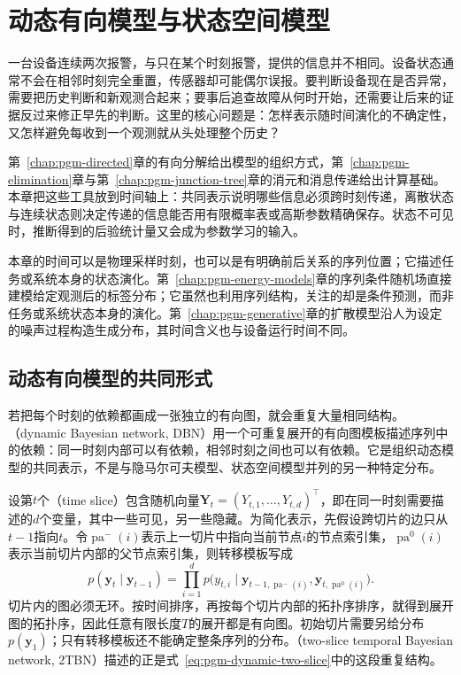 \chapter{动态有向模型与状态空间模型}
\label{chap:pgm-dynamic}

一台设备连续两次报警，与只在某个时刻报警，提供的信息并不相同。设备状态通常不会在相邻时刻完全重置，传感器却可能偶尔误报。要判断设备现在是否异常，需要把历史判断和新观测合起来；要事后追查故障从何时开始，还需要让后来的证据反过来修正早先的判断。这里的核心问题是：怎样表示随时间演化的不确定性，又怎样避免每收到一个观测就从头处理整个历史？

第~\ref{chap:pgm-directed}章的有向分解给出模型的组织方式，第~\ref{chap:pgm-elimination}章与第~\ref{chap:pgm-junction-tree}章的消元和消息传递给出计算基础。本章把这些工具放到时间轴上：共同表示说明哪些信息必须跨时刻传递，离散状态与连续状态则决定传递的信息能否用有限概率表或高斯参数精确保存。状态不可见时，推断得到的后验统计量又会成为参数学习的输入。

本章的时间可以是物理采样时刻，也可以是有明确前后关系的序列位置；它描述任务或系统本身的状态演化。第~\ref{chap:pgm-energy-models}章的序列条件随机场直接建模给定观测后的标签分布；它虽然也利用序列结构，关注的却是条件预测，而非任务或系统状态本身的演化。第~\ref{chap:pgm-generative}章的扩散模型沿人为设定的噪声过程构造生成分布，其时间含义也与设备运行时间不同。

\section{动态有向模型的共同形式}
\label{sec:pgm-dynamic-common}

若把每个时刻的依赖都画成一张独立的有向图，就会重复大量相同结构。（dynamic Bayesian network, DBN）用一个可重复展开的有向图模板描述序列中的依赖：同一时刻内部可以有依赖，相邻时刻之间也可以有依赖。它是组织动态模型的共同表示，不是与隐马尔可夫模型、状态空间模型并列的另一种特定分布。

设第$t$个（time slice）包含随机向量$\bm{Y}_t=(Y_{t,1},\ldots,Y_{t,d})^\top$，即在同一时刻需要描述的$d$个变量，其中一些可见，另一些隐藏。为简化表示，先假设跨切片的边只从$t-1$指向$t$。令$\operatorname{pa}^{-}(i)$表示上一切片中指向当前节点$i$的节点索引集，$\operatorname{pa}^{0}(i)$表示当前切片内部的父节点索引集，则转移模板写成
\begin{equation}
  p(\bm{y}_t\mid\bm{y}_{t-1})
  =\prod_{i=1}^{d}
    p\bigl(y_{t,i}\mid
      \bm{y}_{t-1,\operatorname{pa}^{-}(i)},
      \bm{y}_{t,\operatorname{pa}^{0}(i)}\bigr).
  \label{eq:pgm-dynamic-two-slice}
\end{equation}
切片内的图必须无环。按时间排序，再按每个切片内部的拓扑序排序，就得到展开图的拓扑序，因此任意有限长度$T$的展开都是有向图。初始切片需要另给分布$p(\bm{y}_1)$；只有转移模板还不能确定整条序列的分布。（two-slice temporal Bayesian network, 2TBN）描述的正是式~\eqref{eq:pgm-dynamic-two-slice}中的这段重复结构。

